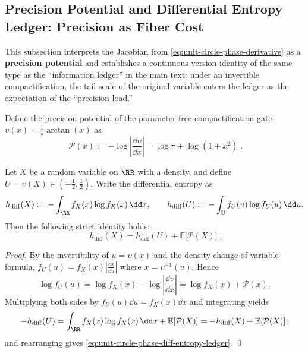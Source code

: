\subsection{Precision Potential and Differential Entropy Ledger: Precision as Fiber Cost}\label{subsec:unit-circle-phase-precision-ledger}
This subsection interprets the Jacobian from \eqref{eq:unit-circle-phase-derivative} as a \textbf{precision potential} and establishes a continuous-version identity of the same type as the ``information ledger'' in the main text: under an invertible compactification, the tail scale of the original variable enters the ledger as the expectation of the ``precision load.''

\begin{definition}\label{def:unit-circle-phase-precision-potential}
Define the precision potential of the parameter-free compactification gate \(\upsilon(x)=\frac{1}{\pi}\arctan(x)\) as
\begin{equation}\label{eq:unit-circle-phase-precision-potential}
\boxed{\;
\mathcal{P}(x):=-\log\left|\frac{\dd \upsilon}{\dd x}\right|
=\log\pi+\log(1+x^2)\; }.
\end{equation}
\end{definition}

\begin{proposition}\label{prop:unit-circle-phase-diff-entropy-ledger}
Let \(X\) be a random variable on \(\RR\) with a density, and define \(U=\upsilon(X)\in(-\tfrac12,\tfrac12)\).
Write the differential entropy as
\[
h_{\mathrm{diff}}(X):=-\int_{\RR} f_X(x)\log f_X(x)\,\dd x,\qquad
h_{\mathrm{diff}}(U):=-\int_{\mathbb{U}} f_U(u)\log f_U(u)\,\dd u.
\]
Then the following strict identity holds:
\begin{equation}\label{eq:unit-circle-phase-diff-entropy-ledger}
\boxed{\;
h_{\mathrm{diff}}(X)=h_{\mathrm{diff}}(U)+\mathbb{E}\bigl[\mathcal{P}(X)\bigr]\; }.
\end{equation}
\end{proposition}
\begin{proof}
By the invertibility of \(u=\upsilon(x)\) and the density change-of-variable formula,
\(
f_U(u)=f_X(x)\left|\frac{\dd x}{\dd u}\right|
\)
where \(x=\upsilon^{-1}(u)\).
Hence
\[
\log f_U(u)=\log f_X(x)-\log\left|\frac{\dd \upsilon}{\dd x}\right|
=\log f_X(x)+\mathcal{P}(x).
\]
Multiplying both sides by \(f_U(u)\dd u=f_X(x)\dd x\) and integrating yields
\[
-h_{\mathrm{diff}}(U)
=\int_{\RR} f_X(x)\log f_X(x)\,\dd x+\mathbb{E}[\mathcal{P}(X)]
=-h_{\mathrm{diff}}(X)+\mathbb{E}[\mathcal{P}(X)],
\]
and rearranging gives \eqref{eq:unit-circle-phase-diff-entropy-ledger}. \qed
\end{proof}

